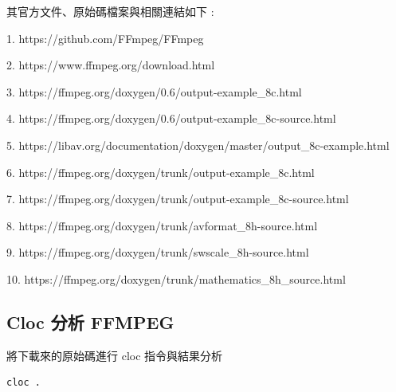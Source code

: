 \documentclass[10pt,UTF8]{ctexart}
\begin{document}
其官方文件、原始碼檔案與相關連結如下 :

1. https://github.com/FFmpeg/FFmpeg

2. https://www.ffmpeg.org/download.html

3. https://ffmpeg.org/doxygen/0.6/output-example\_8c.html

4. https://ffmpeg.org/doxygen/0.6/output-example\_8c-source.html

5. https://libav.org/documentation/doxygen/master/output\_8c-example.html

6. https://ffmpeg.org/doxygen/trunk/output-example\_8c.html

7. https://ffmpeg.org/doxygen/trunk/output-example\_8c-source.html

8. https://ffmpeg.org/doxygen/trunk/avformat\_8h-source.html

9. https://ffmpeg.org/doxygen/trunk/swscale\_8h-source.html

10. https://ffmpeg.org/doxygen/trunk/mathematics\_8h\_source.html

\subsection{Cloc 分析 FFMPEG}

將下載來的原始碼進行 cloc 指令與結果分析

\begin{lstlisting}[language={python}]
cloc .
\end{lstlisting}
\end{document}
